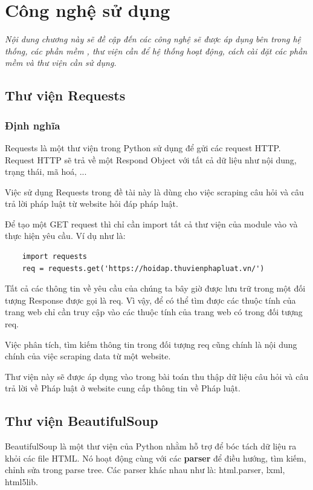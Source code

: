 \chapter{Công nghệ sử dụng}
\label{Chapter3}
\textit{Nội dung chương này sẽ đề cập đến các công nghệ sẽ được áp dụng bên trong hệ thống, các phần mềm , thư viện cần để hệ thống hoạt động, cách cài đặt các phần mềm và thư viện cần sử dụng. }

\section{Thư viện Requests}
\subsection{Định nghĩa }

Requests là một thư viện trong Python sử dụng để gửi các request HTTP. Request HTTP sẽ trả về một Respond Object với tất cả dữ liệu như nội dung, trạng thái, mã hoá, ... 

Việc sử dụng Requests trong đề tài này là dùng cho việc scraping câu hỏi và câu trả lời pháp luật từ website hỏi đáp pháp luật.

Để tạo một GET request thì chỉ cần import tất cả thư viện của module vào và thực hiện yêu cầu. Ví dụ như là:

\begin{lstlisting}
	import requests
	req = requests.get('https://hoidap.thuvienphapluat.vn/')
\end{lstlisting}

Tất cả các thông tin về yêu cầu của chúng ta bây giờ được lưu trữ trong một đối tượng Response được gọi là req. Vì vậy, để có thể tìm được các thuộc tính của trang web chỉ cần truy cập vào các thuộc tính của trang web có trong đối tượng req.

Việc phân tích, tìm kiếm thông tin trong đối tượng req cũng chính là nội dung chính của việc scraping data từ một website.

Thư viện này sẽ được áp dụng vào trong bài toán thu thập dữ liệu câu hỏi và câu trả lời về Pháp luật ở website cung cấp thông tin về Pháp luật.
\section{Thư viện BeautifulSoup}

BeautifulSoup\cite{Scraping} là một thư viện của Python nhằm hỗ trợ để bóc tách dữ liệu ra khỏi các file HTML. Nó hoạt động cùng với các \textbf{parser} để điều hướng, tìm kiếm, chỉnh sửa trong parse tree. Các parser khác nhau như là: html.parser, lxml, html5lib.

